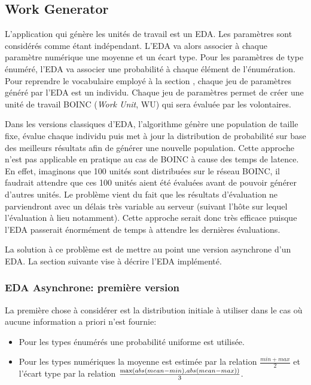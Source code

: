 \documentclass[a4paper, 11pt]{report}
\begin{document}

\subsection{Work Generator}
L'application qui génère les unités de travail est un EDA. Les paramètres sont considérés comme étant indépendant. L'EDA va alors associer à chaque paramètre numérique une moyenne et un écart type. Pour les paramètres de type énuméré, l'EDA va associer une probabilité à chaque élément de l'énumération. Pour reprendre le vocabulaire employé à la section %
, chaque jeu de paramètres généré par l'EDA est un individu. Chaque jeu de paramètres permet de créer une unité de travail \textsc{BOINC} (\textit{Work Unit}, WU) qui sera évaluée par les volontaires. 

Dans les versions classiques d'EDA, %
l'algorithme génère une population de taille fixe, évalue chaque individu puis met à jour la distribution de probabilité sur base des meilleurs résultats afin de générer une nouvelle population. Cette approche n'est pas applicable en pratique au cas de \textsc{BOINC} à cause des temps de latence. En effet, imaginons que 100 unités sont distribuées sur le réseau \textsc{BOINC}, il faudrait attendre que ces 100 unités aient été évaluées avant de pouvoir générer d'autres unités. Le problème vient du fait que les résultats d'évaluation ne parviendront avec un délais très variable au serveur (suivant l'hôte sur lequel l'évaluation à lieu notamment). Cette approche serait donc très efficace puisque l'EDA passerait énormément de temps à attendre les dernières évaluations. 

La solution à ce problème est de mettre au point une version asynchrone d'un EDA. %
La section suivante vise à décrire l'EDA implémenté.

\subsubsection{EDA Asynchrone: première version}
La première chose à considérer est la distribution initiale à utiliser dans le cas où aucune information a priori n'est fournie:
\begin{itemize}
\item Pour les types énumérés une probabilité uniforme est utilisée. %
\item Pour les types numériques la moyenne est estimée par la relation $\frac{min + max}{2}$ et l'écart type par la relation $\frac{\textnormal{max}(abs(mean-min), abs(mean-max))}{3}$.
\end{itemize}
\end{document}
